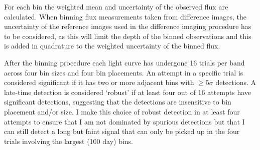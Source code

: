 \documentclass[a4paper,oneside,12pt, class=Latex/Classes/PhDthesisPSnPDF, crop=false]{standalone}
\begin{document}
For each bin the weighted mean and uncertainty of the observed flux are calculated. When binning flux measurements taken from difference images, the uncertainty of the reference images used in the difference imaging procedure has to be considered, as this will limit the depth of the binned observations \citep{ref_uncert} and this is added in quadrature to the weighted uncertainty of the binned flux.

After the binning procedure each light curve has undergone 16 trials per band across four bin sizes and four bin placements. An attempt in a specific trial is considered significant if it has two or more adjacent bins with $\ge5\sigma$ detections. A late-time detection is considered `robust' if at least four out of 16 attempts have significant detections, suggesting that the detections are insensitive to bin placement and/or size. I make this choice of robust detection in at least four attempts to ensure that I am not dominated by spurious detections but that I can still detect a long but faint signal that can only be picked up in the four trials involving the largest (100 day) bins.
\end{document}
